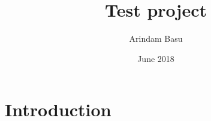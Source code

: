 \documentclass{article}
\title{Test project}
\author{Arindam Basu}
\date{June 2018}
\begin{document}
\maketitle

\section{Introduction}

\end{document}
